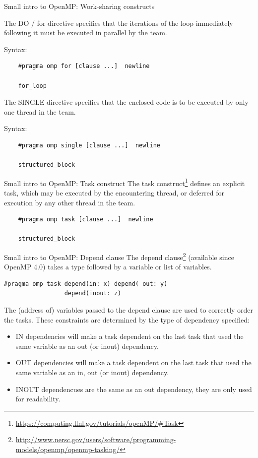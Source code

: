 \documentclass[10pt,xcolor=table]{beamer}
\begin{document}
\begin{frame}[fragile]{Small intro to OpenMP: Work-sharing constructs}

The DO / for directive specifies that the iterations of the loop immediately following it must be executed in parallel by the team.

Syntax:

\begin{verbatim}
    #pragma omp for [clause ...]  newline    
    
    for_loop
\end{verbatim}

The SINGLE directive specifies that the enclosed code is to be executed by only one thread in the team.

Syntax:

\begin{verbatim}
    #pragma omp single [clause ...]  newline 
    
    structured_block
\end{verbatim}

\end{frame}

\begin{frame}[fragile]{Small intro to OpenMP: Task construct}
The task construct\footnote{\url{https://computing.llnl.gov/tutorials/openMP/\#Task}}  defines an explicit task, which may be executed by the encountering thread, or deferred for execution by any other thread in the team.

\begin{verbatim}
    #pragma omp task [clause ...]  newline 

    structured_block
\end{verbatim}
\end{frame}

\begin{frame}[fragile]{Small intro to OpenMP: Depend clause}
The depend clause\footnote{\url{http://www.nersc.gov/users/software/programming-models/openmp/openmp-tasking/}} (available since OpenMP 4.0) takes a type followed by a variable or list of variables.

\begin{verbatim}
#pragma omp task depend(in: x) depend( out: y) 
                 depend(inout: z)    
\end{verbatim}

The (address of) variables passed to the depend clause are used to correctly order the tasks. These constraints are determined by the type of dependency specified:

\begin{itemize}
\footnotesize
\item IN dependencies will make a task dependent on the last task that used the same variable as an out (or inout) dependency. 
\item OUT dependencies will make a task dependent on the last task that used the same variable as an in, out (or inout) dependency.
\item INOUT dependencues are the same as an out dependency, they are only used for readability.
\end{itemize}
\end{frame}
\end{document}
